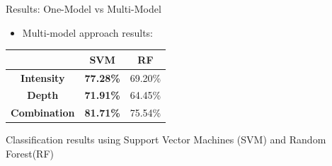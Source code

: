 \documentclass[final,hyperref={pdfpagelabels=false}]{beamer}
\begin{document}
\begin{frame}[t]
\begin{columns}[t]
\begin{column}{.465\textwidth}
\begin{block}{Results: One-Model vs Multi-Model}
%
% 
%
%
% 
%
\begin{itemize}
\item Multi-model approach results:
\end{itemize}

\begin{table}[H]
\centering
\begin{tabular}{|c|c|c|}
\hline
                     & \textbf{SVM}     & \textbf{RF} \\ \hline
\textbf{Intensity}   & \textbf{77.28\%} & 69.20\%     \\ \hline
\textbf{Depth}       & \textbf{71.91\%} & 64.45\%     \\ \hline
\textbf{Combination} & \textbf{81.71\%} & 75.54\%     \\ \hline
\end{tabular}
\label{table:multiModelResults}
\end{table}
\begin{center}
{\small  Classification results using Support Vector Machines (SVM) and Random Forest(RF)}
\end{center}

     

\end{block}
\end{column}
\end{columns}
\end{frame}
\end{document}
